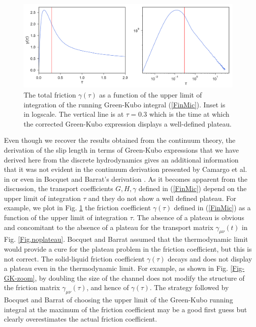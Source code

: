 \documentclass[b5paper,openright,10pt]{book}
\begin{document}
\begin{figure}[]
\includegraphics[width=\linewidth]{etaTotal-17nodes-WALLS}
\caption[The total friction as a funtion of the upper limit of integration of the running Green-Kubo integral for a confined fluid - Thick bins]{The total friction $\gamma(\tau)$ as  a function of the upper
  limit   of   integration   of  the   running   Green-Kubo   integral
  (\ref{FinMic}).  Inset  is in  logscale.  The  vertical line  is  at
  $\tau=0.3$ which is  the time at which the corrected
  Green-Kubo expression displays a well-defined plateau.}
\label{Fig.gammat}
\end{figure}

Even though we  recover the results obtained from the
continuum  theory,  the  derivation  of the  slip
length in  terms of Green-Kubo  expressions that we have  derived here
from the  discrete hydrodynamics gives an  additional information that
it  was not  evident in  the  continuum derivation  presented by Camargo et al. in
\cite{CamargoBC2018}    or   even    in    Bocquet    and   Barrat's    derivation
\cite{Bocquet1994}.  As  it becomes apparent from  the discussion, the
transport coefficients  $G,H,\gamma$ defined in  (\ref{FinMic}) depend
on the upper limit  of integration $\tau$ and they do  not show a well
defined plateau.  For  example, we plot in  Fig.  \ref{Fig.gammat} the
friction  coefficient $\gamma(\tau)$  defined in  (\ref{FinMic}) as  a
function of  the upper limit of  integration $\tau$. The absence  of a
plateau is obvious  and concomitant to the absence of  a plateau for
the     transport     matrix      $\gamma_{\mu\nu}(t)$     in     Fig.
\ref{Fig.noplateau}.   Bocquet and  Barrat \cite{Bocquet2013}  assumed
that  the thermodynamic  limit would  provide a  cure for  the plateau
problem in  the friction  coefficient, but this  is not  correct.  The
solid-liquid friction  coefficient $\gamma(\tau)$ decays and  does not
display a  plateau even  in the thermodynamic  limit. For  example, as
shown in Fig.   \ref{Fig-GK-zoom}, by doubling the size  of the channel
does   not    modify   the   structure   of    the   friction   matrix
$\gamma_{\mu\nu}(\tau)$, and hence of $\gamma(\tau)$.  The strategy followed
by Bocquet and Barrat of
choosing the  upper limit  of the Green-Kubo  running integral  at the
maximum of  the friction coefficient may  be a
good  first  guess  but  clearly  overestimates  the  actual  friction
coefficient.
\end{document}

